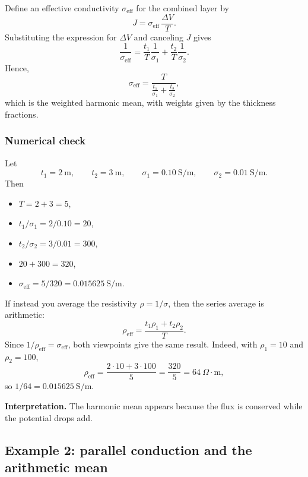 \documentclass[a4paper,10pt]{article}
\begin{document}
Define an effective conductivity $\sigma_{\mathrm{eff}}$ for the combined layer by
\begin{equation}
J = \sigma_{\mathrm{eff}}\,\frac{\Delta V}{T}.
\end{equation}
Substituting the expression for $\Delta V$ and canceling $J$ gives
\begin{equation}
\frac{1}{\sigma_{\mathrm{eff}}}
= \frac{t_1}{T}\frac{1}{\sigma_1}
+ \frac{t_2}{T}\frac{1}{\sigma_2}.
\end{equation}
Hence,
\begin{equation}
\sigma_{\mathrm{eff}}
= \frac{T}{\frac{t_1}{\sigma_1}+\frac{t_2}{\sigma_2}},
\end{equation}
which is the weighted harmonic mean, with weights given by the thickness fractions.

\subsubsection{Numerical check}

Let
\[
t_1=2\ \text{m}, \qquad t_2=3\ \text{m}, \qquad
\sigma_1=0.10\ \text{S/m}, \qquad \sigma_2=0.01\ \text{S/m}.
\]
Then
\begin{itemize}
\item $T = 2+3 = 5$,
\item $t_1/\sigma_1 = 2/0.10 = 20$,
\item $t_2/\sigma_2 = 3/0.01 = 300$,
\item $20+300=320$,
\item $\sigma_{\mathrm{eff}} = 5/320 = 0.015625\ \text{S/m}$.
\end{itemize}

If instead you average the resistivity $\rho=1/\sigma$, then the series average is arithmetic:
\begin{equation}
\rho_{\mathrm{eff}} = \frac{t_1\rho_1+t_2\rho_2}{T}.
\end{equation}
Since $1/\rho_{\mathrm{eff}}=\sigma_{\mathrm{eff}}$, both viewpoints give the same result. Indeed, with $\rho_1=10$ and $\rho_2=100$,
\[
\rho_{\mathrm{eff}} = \frac{2\cdot 10 + 3\cdot 100}{5} = \frac{320}{5}=64\ \Omega\cdot\text{m},
\]
so $1/64 = 0.015625\ \text{S/m}$.

\textbf{Interpretation.} The harmonic mean appears because the flux is conserved while the potential drops add.

\subsection{Example 2: parallel conduction and the arithmetic mean}
\end{document}
